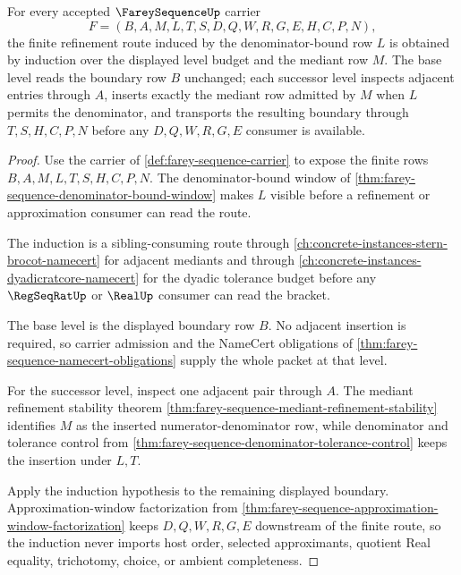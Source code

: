 \begin{theorem}
\label{thm:farey-sequence-denominator-refinement-induction}
For every accepted $\FareySequenceUp$ carrier
$$
F=(B,A,M,L,T,S,D,Q,W,R,G,E,H,C,P,N),
$$
the finite refinement route induced by the denominator-bound row $L$ is obtained by induction over the displayed level budget and the mediant row $M$. The base level reads the boundary row $B$ unchanged; each successor level inspects adjacent entries through $A$, inserts exactly the mediant row admitted by $M$ when $L$ permits the denominator, and transports the resulting boundary through $T,S,H,C,P,N$ before any $D,Q,W,R,G,E$ consumer is available.
\end{theorem}
\begin{proof}
Use the carrier of \autoref{def:farey-sequence-carrier} to expose the finite rows $B,A,M,L,T,S,H,C,P,N$. The denominator-bound window of \autoref{thm:farey-sequence-denominator-bound-window} makes $L$ visible before a refinement or approximation consumer can read the route.

The induction is a sibling-consuming route through \autoref{ch:concrete-instances-stern-brocot-namecert} for adjacent mediants and through \autoref{ch:concrete-instances-dyadicratcore-namecert} for the dyadic tolerance budget before any $\RegSeqRatUp$ or $\RealUp$ consumer can read the bracket.

The base level is the displayed boundary row $B$. No adjacent insertion is required, so carrier admission and the NameCert obligations of \autoref{thm:farey-sequence-namecert-obligations} supply the whole packet at that level.

For the successor level, inspect one adjacent pair through $A$. The mediant refinement stability theorem \autoref{thm:farey-sequence-mediant-refinement-stability} identifies $M$ as the inserted numerator-denominator row, while denominator and tolerance control from \autoref{thm:farey-sequence-denominator-tolerance-control} keeps the insertion under $L,T$.

Apply the induction hypothesis to the remaining displayed boundary. Approximation-window factorization from \autoref{thm:farey-sequence-approximation-window-factorization} keeps $D,Q,W,R,G,E$ downstream of the finite route, so the induction never imports host order, selected approximants, quotient Real equality, trichotomy, choice, or ambient completeness.
\end{proof}

